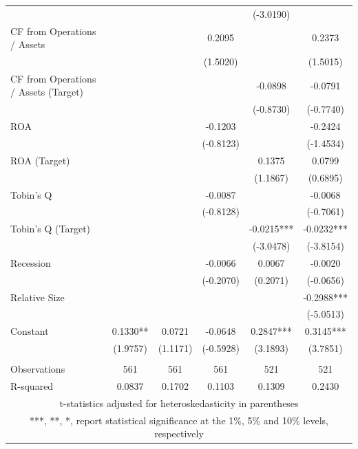 \documentclass[12pt]{article}
\begin{document}
\begin{appendices}
\begin{table}[!htbp]
\begin{adjustbox}{max width=\textwidth}
\begin{tabular}{lccccc}
			&  &  &  & (-3.0190) &  \\
		   CF from Operations / Assets &  &  & 0.2095 &  & 0.2373 \\
			&  &  & (1.5020) &  & (1.5015) \\
		   CF from Operations / Assets (Target) &  &  &  & -0.0898 & -0.0791 \\
			&  &  &  & (-0.8730) & (-0.7740) \\
		   ROA &  &  & -0.1203 &  & -0.2424 \\
			&  &  & (-0.8123) &  & (-1.4534) \\
		   ROA (Target) &  &  &  & 0.1375 & 0.0799 \\
			&  &  &  & (1.1867) & (0.6895) \\
		   Tobin's Q &  &  & -0.0087 &  & -0.0068 \\
			&  &  & (-0.8128) &  & (-0.7061) \\
		   Tobin's Q (Target) &  &  &  & -0.0215*** & -0.0232*** \\
			&  &  &  & (-3.0478) & (-3.8154) \\
		   Recession &  &  & -0.0066 & 0.0067 & -0.0020 \\
			&  &  & (-0.2070) & (0.2071) & (-0.0656) \\
		   Relative Size &  &  &  &  & -0.2988*** \\
			&  &  &  &  & (-5.0513) \\
		   Constant & 0.1330** & 0.0721 & -0.0648 & 0.2847*** & 0.3145*** \\
			& (1.9757) & (1.1171) & (-0.5928) & (3.1893) & (3.7851) \\
			&  &  &  &  &  \\
		   Observations & 561 & 561 & 561 & 521 & 521 \\
			R-squared & 0.0837 & 0.1702 & 0.1103 & 0.1309 & 0.2430 \\ \hline
			\multicolumn{6}{c}{ t-statistics adjusted for heteroskedasticity in parentheses} \\
			\multicolumn{6}{c}{ ***, **, *, report statistical significance at the 1\%, 5\% and 10\% levels, respectively}\\
		   \end{tabular}			 
	\end{adjustbox}
\end{table}


\end{appendices}
\end{document}
